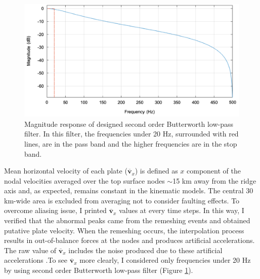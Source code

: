 \documentclass[letterpaper,12pt,notitle]{memphisthesis}                     %
\begin{document}
\begin{figure}[!htb]
	\centering
	\includegraphics[width=0.8\linewidth]{./figs/filter.png}
	\caption{Magnitude response of designed second order Butterworth low-pass filter. In this filter, the frequencies under 20 Hz, surrounded with red lines, are in the pass band and the higher frequencies are in the stop band.}
	\label{fig:filter}
\end{figure}
Mean horizontal velocity of each plate ($\overline{\boldsymbol{v}}_{x}$) is defined as $x$ component of the nodal velocities averaged over the top surface nodes $\sim$15 km away from the ridge axis and, as expected, remains constant in the kinematic models. The central 30 km-wide area is excluded from averaging not to consider faulting effects. To overcome aliasing issue, I printed $\overline{\boldsymbol{v}}_{x}$ values at every time steps. In this way, I verified that the abnormal peaks came from the remeshing events and obtained putative plate velocity. When the remeshing occurs, the interpolation process results in out-of-balance forces at the nodes and produces artificial accelerations. The raw value of $\overline{\boldsymbol{v}}_{x}$ includes the noise produced due to these artificial accelerations .To see $\overline{\boldsymbol{v}}_{x}$ more clearly, I considered only frequencies under 20 Hz by using second order Butterworth low-pass filter (Figure \ref{fig:filter}).
\end{document}
